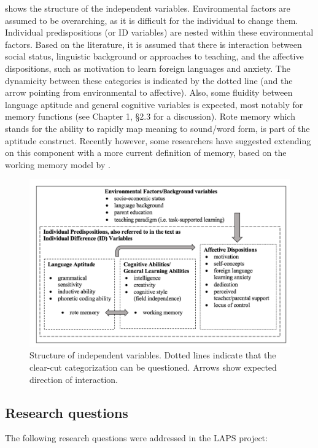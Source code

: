 \documentclass[output=paper]{langsci/langscibook}
\begin{document}
 shows the structure of the independent variables. Environmental factors are assumed to be overarching, as it is difficult for the individual to change them. Individual predispositions (or ID variables) are nested within these environmental factors. Based on the literature, it is assumed that there is interaction between social status, linguistic background or approaches to teaching, and the affective dispositions, such as motivation to learn foreign languages and anxiety. The dynamicity between these categories is indicated by the dotted line (and the arrow pointing from environmental to affective). Also, some fluidity between language aptitude and general cognitive variables is expected, most notably for memory functions (see Chapter 1, §2.3 for a discussion). Rote memory which stands for the ability to rapidly map meaning to sound/word form, is part of the aptitude construct. Recently however, some researchers have suggested extending on this component with a more current definition of memory, based on the working memory model by \citet{BaddeleyHitch1974}. 

\begin{figure}
\includegraphics[width=\textwidth]{figures/intro-fig1.png}
\caption{Structure of independent variables. Dotted lines indicate that the clear-cut categorization can be questioned. Arrows show expected direction of interaction.\label{fig:intro:1}}
\end{figure}

\subsection{Research questions}\label{sec:intro:4.2}

The following research questions were addressed in the LAPS project:
\end{document}
